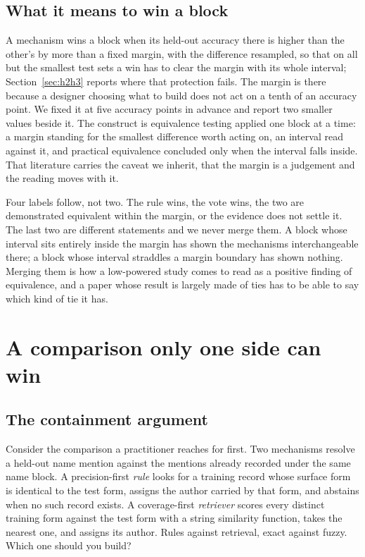 \documentclass[11pt]{article}
\begin{document}
\subsection{What it means to win a block}
\label{sec:winning}

A mechanism wins a block when its held-out accuracy there is higher than the
other's by more than a fixed margin, with the difference resampled, so that
on all but the smallest test sets a win has to clear the margin with its
whole interval; Section~\ref{sec:h2h3} reports where that protection fails.
The margin is there because a designer
choosing what to build does not act on a tenth of an accuracy point. We fixed
it at five accuracy points in advance and report two smaller values beside it.
The construct is equivalence testing \citep{lakens2017} applied one block at a
time: a margin standing for the smallest difference worth acting on, an
interval read against it, and practical equivalence concluded only when the
interval falls inside. That literature carries the caveat we inherit, that the
margin is a judgement and the reading moves with it.

Four labels follow, not two. The rule wins, the vote wins, the two are
demonstrated equivalent within the margin, or the evidence does not settle it.
The last two are different statements and we never merge them. A block whose
interval sits entirely inside the margin has shown the mechanisms
interchangeable there; a block whose interval straddles a margin boundary has
shown nothing. Merging them is how a low-powered study comes to read as a
positive finding of equivalence, and a paper whose result is largely made of
ties has to be able to say which kind of tie it has.

\section{A comparison only one side can win}
\label{sec:degenerate}

\subsection{The containment argument}
\label{sec:containment}

Consider the comparison a practitioner reaches for first. Two mechanisms
resolve a held-out name mention against the mentions already recorded under
the same name block. A precision-first \emph{rule} looks for a training record
whose surface form is identical to the test form, assigns the author carried
by that form, and abstains when no such record exists. A coverage-first
\emph{retriever} scores every distinct training form against the test form
with a string similarity function, takes the nearest one, and assigns its
author. Rules against retrieval, exact against fuzzy. Which one should you
build?
\end{document}
